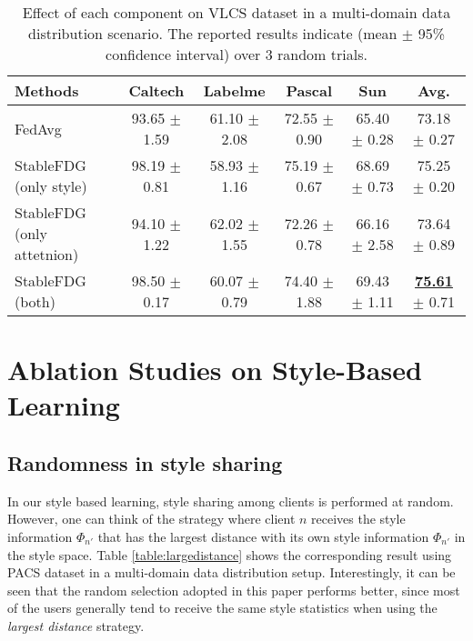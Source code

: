 \documentclass{article}
\theoremstyle{plain}
\theoremstyle{definition}
\theoremstyle{remark}
\begin{document}
\begin{table}[h]
\small
\centering
	\begin{tabular}{l|    cccc | c}
		\toprule  
		Methods   &Caltech  & Labelme & Pascal & Sun & Avg. \\ 
		\midrule	
		FedAvg \cite{mcmahan2017communication}   & 93.65 $\pm$ 1.59 & 61.10 $\pm$  2.08 & 72.55 $\pm$ 0.90 & 65.40 $\pm$ 0.28  & 73.18 $\pm$  0.27 \\ 
		StableFDG (only style) & 98.19 $\pm$  0.81 &58.93 $\pm$ 1.16 &75.19 $\pm$  0.67 &68.69 $\pm$  0.73 & 75.25 $\pm$  0.20 \\
		StableFDG (only attetnion) & 94.10 $\pm$  1.22 &62.02 $\pm$  1.55 &72.26 $\pm$  0.78 &66.16 $\pm$  2.58 &73.64 $\pm$  0.89 \\
		StableFDG (both) & 98.50 $\pm$ 0.17 &60.07 $\pm$  0.79 &74.40 $\pm$  1.88 &69.43 $\pm$  1.11 & \textbf{\underline{75.61}} $\pm$  0.71  \\
		\bottomrule
	\end{tabular}
\vspace{+3mm}
\caption{Effect of each component on VLCS dataset in a multi-domain data distribution scenario. The reported results indicate (mean $\pm$ 95\% confidence interval) over 3 random trials.} 
\label{table:eachcomp}
\end{table} 



\section{Ablation Studies on Style-Based Learning}

\subsection{Randomness in style sharing}
In our style based learning, style sharing among clients is performed at random. However, one can think of the strategy where client $n$  receives the style information $\Phi_{n'}$  that has the largest distance with its own style information $\Phi_{n'}$ in the style space.  Table \ref{table:largedistance} shows the corresponding result using PACS dataset in a multi-domain data distribution setup. Interestingly, it can be seen that the random selection adopted in this paper performs better, since most of the users generally tend to receive the same style statistics when using the \textit{largest distance} strategy.
\end{document}
